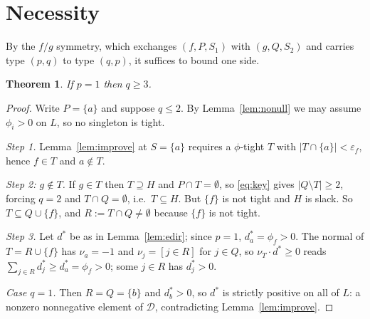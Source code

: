 \documentclass[11pt]{article}
\newtheorem{theorem}{Theorem}
\begin{document}
\section{Necessity}\label{sec:nec}

By the $f/g$ symmetry, which exchanges $(f,P,S_1)$ with $(g,Q,S_2)$ and carries
type $(p,q)$ to type $(q,p)$, it suffices to bound one side.

\begin{theorem}\label{thm:g1}
If $p=1$ then $q\ge3$.
\end{theorem}

\begin{proof}
Write $P=\{a\}$ and suppose $q\le2$.  By Lemma~\ref{lem:nonull} we may assume
$\phi_i>0$ on $L$, so no singleton is tight.

\emph{Step 1.}  Lemma~\ref{lem:improve} at $S=\{a\}$ requires a $\phi$-tight
$T$ with $|T\cap\{a\}|<\varepsilon_f$, hence $f\in T$ and $a\notin T$.

\emph{Step 2: $g\notin T$.}  If $g\in T$ then $T\supseteq H$ and
$P\cap T=\emptyset$, so \eqref{eq:key} gives $|Q\setminus T|\ge2$, forcing
$q=2$ and $T\cap Q=\emptyset$, i.e.\ $T\subseteq H$.  But $\{f\}$ is not tight
and $H$ is slack.  So $T\subseteq Q\cup\{f\}$, and $R:=T\cap Q\ne\emptyset$
because $\{f\}$ is not tight.

\emph{Step 3.}  Let $d^\ast$ be as in Lemma~\ref{lem:edir}; since $p=1$,
$d^\ast_a=\phi_f>0$.  The normal of $T=R\cup\{f\}$ has $\nu_a=-1$ and
$\nu_j=[j\in R]$ for $j\in Q$, so $\nu_T\cdot d^\ast\ge0$ reads
$\sum_{j\in R}d^\ast_j\ge d^\ast_a=\phi_f>0$; some $j\in R$ has
$d^\ast_j>0$.

\emph{Case $q=1$.}  Then $R=Q=\{b\}$ and $d^\ast_b>0$, so $d^\ast$ is strictly
positive on all of $L$: a nonzero nonnegative element of $\mathcal D$,
contradicting Lemma~\ref{lem:improve}.


\end{proof}
\end{document}
